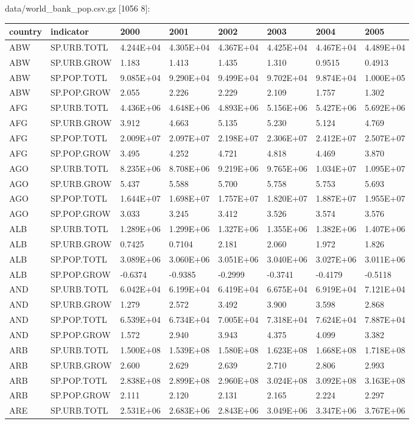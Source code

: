 \documentclass[]{article}
\begin{document}
data/world\_bank\_pop.csv.gz {[}1056 8{]}:

\begin{longtable}[]{@{}llllllll@{}}
\toprule
country & indicator & 2000 & 2001 & 2002 & 2003 & 2004 &
2005\tabularnewline
\midrule
\endhead
ABW & SP.URB.TOTL & 4.244E+04 & 4.305E+04 & 4.367E+04 & 4.425E+04 &
4.467E+04 & 4.489E+04\tabularnewline
ABW & SP.URB.GROW & 1.183 & 1.413 & 1.435 & 1.310 & 0.9515 &
0.4913\tabularnewline
ABW & SP.POP.TOTL & 9.085E+04 & 9.290E+04 & 9.499E+04 & 9.702E+04 &
9.874E+04 & 1.000E+05\tabularnewline
ABW & SP.POP.GROW & 2.055 & 2.226 & 2.229 & 2.109 & 1.757 &
1.302\tabularnewline
AFG & SP.URB.TOTL & 4.436E+06 & 4.648E+06 & 4.893E+06 & 5.156E+06 &
5.427E+06 & 5.692E+06\tabularnewline
AFG & SP.URB.GROW & 3.912 & 4.663 & 5.135 & 5.230 & 5.124 &
4.769\tabularnewline
AFG & SP.POP.TOTL & 2.009E+07 & 2.097E+07 & 2.198E+07 & 2.306E+07 &
2.412E+07 & 2.507E+07\tabularnewline
AFG & SP.POP.GROW & 3.495 & 4.252 & 4.721 & 4.818 & 4.469 &
3.870\tabularnewline
AGO & SP.URB.TOTL & 8.235E+06 & 8.708E+06 & 9.219E+06 & 9.765E+06 &
1.034E+07 & 1.095E+07\tabularnewline
AGO & SP.URB.GROW & 5.437 & 5.588 & 5.700 & 5.758 & 5.753 &
5.693\tabularnewline
AGO & SP.POP.TOTL & 1.644E+07 & 1.698E+07 & 1.757E+07 & 1.820E+07 &
1.887E+07 & 1.955E+07\tabularnewline
AGO & SP.POP.GROW & 3.033 & 3.245 & 3.412 & 3.526 & 3.574 &
3.576\tabularnewline
ALB & SP.URB.TOTL & 1.289E+06 & 1.299E+06 & 1.327E+06 & 1.355E+06 &
1.382E+06 & 1.407E+06\tabularnewline
ALB & SP.URB.GROW & 0.7425 & 0.7104 & 2.181 & 2.060 & 1.972 &
1.826\tabularnewline
ALB & SP.POP.TOTL & 3.089E+06 & 3.060E+06 & 3.051E+06 & 3.040E+06 &
3.027E+06 & 3.011E+06\tabularnewline
ALB & SP.POP.GROW & -0.6374 & -0.9385 & -0.2999 & -0.3741 & -0.4179 &
-0.5118\tabularnewline
AND & SP.URB.TOTL & 6.042E+04 & 6.199E+04 & 6.419E+04 & 6.675E+04 &
6.919E+04 & 7.121E+04\tabularnewline
AND & SP.URB.GROW & 1.279 & 2.572 & 3.492 & 3.900 & 3.598 &
2.868\tabularnewline
AND & SP.POP.TOTL & 6.539E+04 & 6.734E+04 & 7.005E+04 & 7.318E+04 &
7.624E+04 & 7.887E+04\tabularnewline
AND & SP.POP.GROW & 1.572 & 2.940 & 3.943 & 4.375 & 4.099 &
3.382\tabularnewline
ARB & SP.URB.TOTL & 1.500E+08 & 1.539E+08 & 1.580E+08 & 1.623E+08 &
1.668E+08 & 1.718E+08\tabularnewline
ARB & SP.URB.GROW & 2.600 & 2.629 & 2.639 & 2.710 & 2.806 &
2.993\tabularnewline
ARB & SP.POP.TOTL & 2.838E+08 & 2.899E+08 & 2.960E+08 & 3.024E+08 &
3.092E+08 & 3.163E+08\tabularnewline
ARB & SP.POP.GROW & 2.111 & 2.120 & 2.131 & 2.165 & 2.224 &
2.297\tabularnewline
ARE & SP.URB.TOTL & 2.531E+06 & 2.683E+06 & 2.843E+06 & 3.049E+06 &
3.347E+06 & 3.767E+06\tabularnewline
\bottomrule
\end{longtable}
\end{document}
